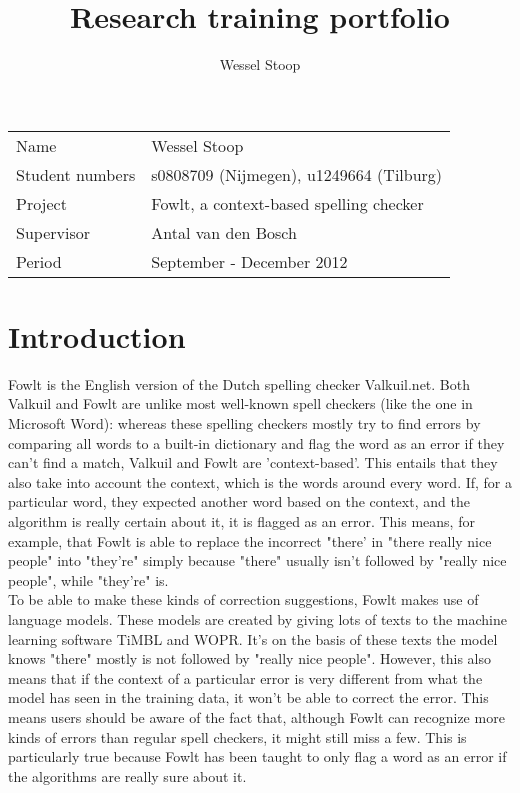 \documentclass[12pt]{article}
\title{Research training portfolio}
\author{Wessel Stoop}
\begin{document}
\maketitle

\begin{table}[h]
\begin{tabular}{ll}
Name&Wessel Stoop\\
Student numbers&s0808709 (Nijmegen), u1249664 (Tilburg)\\
Project&Fowlt, a context-based spelling checker\\
Supervisor&Antal van den Bosch\\
Period&September - December 2012\\
\end{tabular}
\end{table}

\section{Introduction}
Fowlt is the English version of the Dutch spelling checker Valkuil.net. Both Valkuil and Fowlt are unlike most well-known spell checkers (like the one in Microsoft Word): whereas these spelling checkers mostly try to find errors by comparing all words to a built-in dictionary and flag the word as an error if they can't find a match, Valkuil and Fowlt are 'context-based'. This entails that they also take into account the context, which is the words around every word. If, for a particular word, they expected another word based on the context, and the algorithm is really certain about it, it is flagged as an error. This means, for example, that Fowlt is able to replace the incorrect "there' in "there really nice people" into "they're" simply because "there" usually isn't followed by "really nice people", while "they're" is. 
\\\indent
To be able to make these kinds of correction suggestions, Fowlt makes use of language models. These models are created by giving lots of texts to the machine learning software TiMBL and WOPR. It's on the basis of these texts the model knows "there" mostly is not followed by "really nice people". However, this also means that if the context of a particular error is very different from what the model has seen in the training data, it won't be able to correct the error. This means users should be aware of the fact that, although Fowlt can recognize more kinds of errors than regular spell checkers, it might still miss a few. This is particularly true because Fowlt has been taught to only flag a word as an error if the algorithms are really sure about it.
\end{document}
